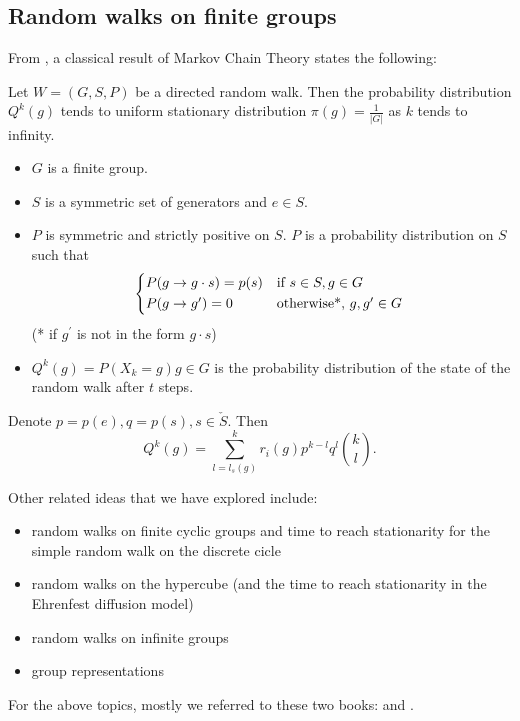 \documentclass{article}
\begin{document}
\subsection{Random walks on finite groups}
From \cite{pak_random_1997}, a classical result of Markov Chain Theory states the following:
\begin{thm}
Let $W = (G,S,P)$ be a directed random walk. Then the probability distribution $Q^k(g)$ tends to uniform stationary distribution $\pi(g) =\frac{1}{|G|}$ as $k$ tends to infinity.
\begin{itemize}
    \item $G$ is a finite group. 
    \item $S$ is a symmetric set of generators and $e\in S$. 
    \item $P$ is symmetric and strictly positive on $S$. $P$ is a probability distribution on $S$ such that
    \[\begin{cases*}
        P(g\to g \cdot s) = p(s) & if $s \in S, g\in G$  \\
        P(g\to g^\prime) = 0     & otherwise*, $g,g^\prime \in G$
    \end{cases*} \]
    (* if $g^\prime$ is not in the form $g\cdot s$)
    \item $Q^k(g) = P(X_k =g) g\in G$ is the probability distribution of the state of the random walk after $t$ steps. 
\end{itemize} 
\end{thm}
\begin{thm}
Denote $p = p(e), q = p(s), s\in \check{S}$. Then 
\begin{equation}
    Q^k(g) = \sum^k_{l = l_s(g)} r_i(g) p^{k-l} q^l {k \choose l}.
\end{equation}
\end{thm}

\par Other related ideas that we have explored include:
\begin{itemize}
    \item random walks on finite cyclic groups and time to reach stationarity for the simple random walk on the discrete cicle
    \item random walks on the hypercube (and the time to reach stationarity in the Ehrenfest diffusion model)
    \item random walks on infinite groups
    \item group representations
\end{itemize}
For the above topics, mostly we referred to these two books: \cite{ceccherini-silberstein_harmonic_2008} and \cite{diaconis_group_1988}. 
\end{document}
